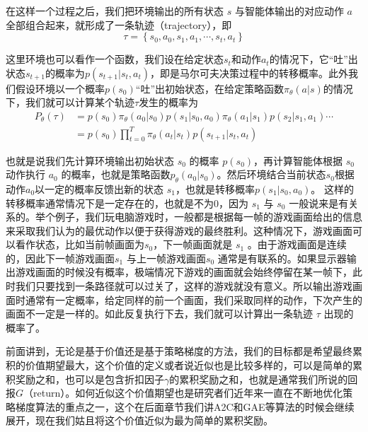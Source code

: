 在这样一个过程之后，我们把环境输出的所有状态 $s$ 与智能体输出的对应动作 $a$ 全部组合起来，就形成了一条轨迹（trajectory），即
\begin{equation}
    \label{eq:}
    \tau=\left\{s_{0}, a_{0}, s_{1}, a_{1}, \cdots, s_{t}, a_{t}\right\}
\end{equation}

这里环境也可以看作一个函数，我们设在给定状态$s_t$和动作$a_t$的情况下，它“吐”出状态$s_{t+1}$的概率为$p(s_{t+1} | s_{t}, a_{t})$，即是马尔可夫决策过程中的转移概率。此外我们假设环境以一个概率$p(s_{0})$“吐”出初始状态，在给定策略函数$\pi_{\theta}(a|s)$的情况下，我们就可以计算某个轨迹$\tau$发生的概率为
\begin{equation}
    \label{eq:station_dist}
    \begin{aligned}
        P_{\theta}(\tau)
        &=p(s_{0}) \pi_{\theta}(a_{0} | s_{0}) p(s_{1} | s_{0}, a_{0}) \pi_{\theta}(a_{1} | s_{1}) p(s_{2} | s_{1}, a_{1}) \cdots \\
        &=p(s_{0}) \prod_{t=0}^{T} \pi_{\theta}\left(a_{t} | s_{t}\right) p\left(s_{t+1} | s_{t}, a_{t}\right)
    \end{aligned}
\end{equation}

也就是说我们先计算环境输出初始状态 $s_0$ 的概率 $p(s_0)$，再计算智能体根据 $s_0$ 动作执行 $a_0$ 的概率，也就是策略函数$p_{\theta}\left(a_{0} | s_{0}\right)$。然后环境结合当前状态$s_0$根据动作$a_0$以一定的概率反馈出新的状态 $s_1$，也就是转移概率$p(s_{1} | s_{0}, a_{0})$。 
这样的转移概率通常情况下是一定存在的，也就是不为0，因为 $s_1$ 与 $s_0$ 一般说来是有关系的。举个例子，我们玩电脑游戏时，一般都是根据每一帧的游戏画面给出的信息来采取我们认为的最优动作以便于获得游戏的最终胜利。这种情况下，游戏画面可以看作状态，比如当前帧画面为$s_0$，下一帧画面就是 $s_1$ 。由于游戏画面是连续的，因此下一帧游戏画面$s_1$ 与上一帧游戏画面$s_0$ 通常是有联系的。如果显示器输出游戏画面的时候没有概率，极端情况下游戏的画面就会始终停留在某一帧下，此时我们只要找到一条路径就可以过关了，这样的游戏就没有意义。所以输出游戏画面时通常有一定概率，给定同样的前一个画面，我们采取同样的动作，下次产生的画面不一定是一样的。如此反复执行下去，我们就可以计算出一条轨迹 $\tau$ 出现的概率了。

前面讲到，无论是基于价值还是基于策略梯度的方法，我们的目标都是希望最终累积的价值期望最大，这个价值的定义或者说近似也是比较多样的，可以是简单的累积奖励之和，也可以是包含折扣因子$\gamma$的累积奖励之和，也就是通常我们所说的回报$G$（return）。如何近似这个价值期望也是研究者们近年来一直在不断地优化策略梯度算法的重点之一，这个在后面章节我们讲A2C和GAE等算法的时候会继续展开，现在我们姑且将这个价值近似为最为简单的累积奖励。

